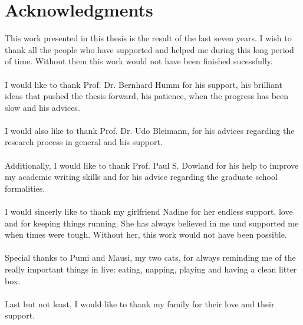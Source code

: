 

\bigskip

\begingroup
\let\clearpage\relax
\let\cleardoublepage\relax
\let\cleardoublepage\relax
\chapter*{Acknowledgments}
This work presented in this thesis is the result of the last seven years. I wish to thank all the people who have supported and helped me during this long period of time. Without them this work would not have been finished sucessfully.
\\\\
I would like to thank Prof. Dr. Bernhard Humm for his support, his brilliant ideas that pushed the thesis forward, his patience, when the progress has been slow and his advices.
\\\\
I would also like to thank Prof. Dr. Udo Bleimann, for his advices regarding the research process in general and his support.
\\\\
Additionally, I would like to thank Prof. Paul S. Dowland for his help to improve my academic writing skills and for his advice regarding the graduate school formalities.
\\\\
I would sincerly like to thank my girlfriend Nadine for her endless support, love and for keeping things running. She has always believed in me und supported me when times were tough. Without her, this work would not have been possible.
\\\\
Special thanks to Pumi and Mausi, my two cats, for always reminding me of the really important things in live: eating, napping, playing and having a clean litter box.
\\\\
Last but not least, I would like to thank my family for their love and their support.

\endgroup



